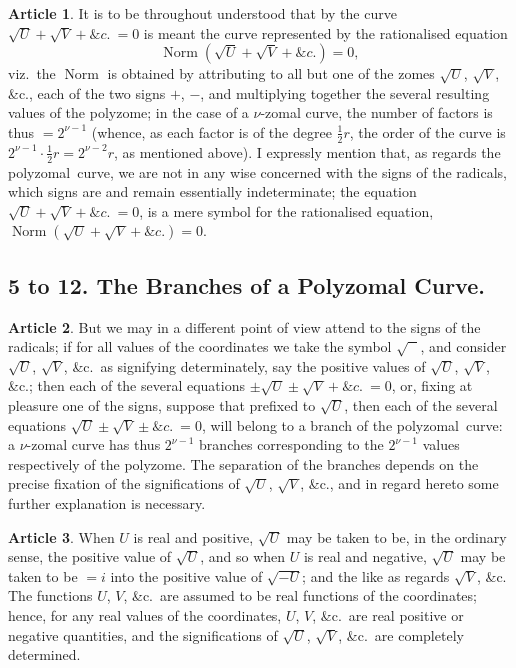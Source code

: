 \documentclass[11pt,a4paper]{article}
\theoremstyle{definition}
\newtheorem{art}{Article}
\newcommand{\polyzomal}{polyzomal}
\newcommand{\polyzome}{polyzome}
\DeclareMathOperator{\Norm}{Norm}
\newcommand{\norm}{\Norm}
\begin{document}
\begin{art}
It is to be throughout understood that by the curve $\sqrt{U} + \sqrt{V} + \&c.\ = 0$ is meant the curve represented by the rationalised equation
\[
\norm(\sqrt{U} + \sqrt{V} + \&c.) = 0,
\]
viz.\ the $\norm$ is obtained by attributing to all but one of the zomes $\sqrt{U}$, $\sqrt{V}$, \&c., each of the two signs $+$, $-$, and multiplying together the several resulting values of the \polyzome; in the case of a $\nu$-zomal curve, the number of factors is thus $= 2^{\nu-1}$ (whence, as each factor is of the degree $\tfrac{1}{2}r$, the order of the curve is $2^{\nu-1} \cdot \tfrac{1}{2}r = 2^{\nu-2}r$, as mentioned above). I expressly mention that, as regards the \polyzomal\ curve, we are not in any wise concerned with the signs of the radicals, which signs are and remain essentially indeterminate; the equation $\sqrt{U} + \sqrt{V} + \&c.\ = 0$, is a mere symbol for the rationalised equation, $\norm(\sqrt{U} + \sqrt{V} + \&c.) = 0$.
\end{art}

\subsection*{5 to 12. The Branches of a Polyzomal Curve.}

\begin{art}
But we may in a different point of view attend to the signs of the radicals; if for all values of the coordinates we take the symbol $\sqrt{\phantom{U}}$, and consider $\sqrt{U}$, $\sqrt{V}$, \&c.\ as signifying determinately, say the positive values of $\sqrt{U}$, $\sqrt{V}$, \&c.; then each of the several equations $\pm\sqrt{U} \pm \sqrt{V} + \&c.\ = 0$, or, fixing at pleasure one of the signs, suppose that prefixed to $\sqrt{U}$, then each of the several equations $\sqrt{U} \pm \sqrt{V} \pm \&c.\ = 0$, will belong to a branch of the \polyzomal\ curve: a $\nu$-zomal curve has thus $2^{\nu-1}$ branches corresponding to the $2^{\nu-1}$ values respectively of the \polyzome. The separation of the branches depends on the precise fixation of the significations of $\sqrt{U}$, $\sqrt{V}$, \&c., and in regard hereto some further explanation is necessary.
\end{art}

\begin{art}
When $U$ is real and positive, $\sqrt{U}$ may be taken to be, in the ordinary sense, the positive value of $\sqrt{U}$, and so when $U$ is real and negative, $\sqrt{U}$ may be taken to be $= i$ into the positive value of $\sqrt{-U}$; and the like as regards $\sqrt{V}$, \&c. The functions $U$, $V$, \&c.\ are assumed to be real functions of the coordinates; hence, for any real values of the coordinates, $U$, $V$, \&c.\ are real positive or negative quantities, and the significations of $\sqrt{U}$, $\sqrt{V}$, \&c.\ are completely determined.
\end{art}
\end{document}
